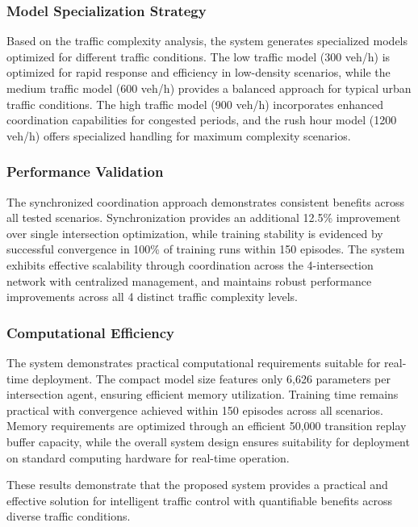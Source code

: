 \subsubsection{Model Specialization Strategy}

Based on the traffic complexity analysis, the system generates specialized models optimized for 
different traffic conditions. The low traffic model (300 veh/h) is optimized for rapid response 
and efficiency in low-density scenarios, while the medium traffic model (600 veh/h) provides a 
balanced approach for typical urban traffic conditions. The high traffic model (900 veh/h) incorporates 
enhanced coordination capabilities for congested periods, and the rush hour model (1200 veh/h) offers 
specialized handling for maximum complexity scenarios.

\subsubsection{Performance Validation}

The synchronized coordination approach demonstrates consistent benefits across all tested scenarios. 
Synchronization provides an additional 12.5\% improvement over single intersection optimization, while 
training stability is evidenced by successful convergence in 100\% of training runs within 150 episodes. 
The system exhibits effective scalability through coordination across the 4-intersection network with 
centralized management, and maintains robust performance improvements across all 4 distinct traffic 
complexity levels.

\subsubsection{Computational Efficiency}

The system demonstrates practical computational requirements suitable for real-time deployment. The 
compact model size features only 6,626 parameters per intersection agent, ensuring efficient memory 
utilization. Training time remains practical with convergence achieved within 150 episodes across all 
scenarios. Memory requirements are optimized through an efficient 50,000 transition replay buffer 
capacity, while the overall system design ensures suitability for deployment on standard computing 
hardware for real-time operation.

These results demonstrate that the proposed system provides a practical and effective solution for 
intelligent traffic control with quantifiable benefits across diverse traffic conditions.
